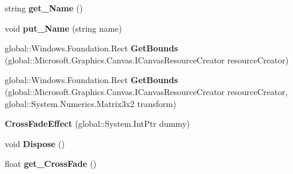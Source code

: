 \begin{DoxyCompactItemize}
\item 
\mbox{\label{class_microsoft_1_1_graphics_1_1_canvas_1_1_effects_1_1_cross_fade_effect_af808185116788b9dbc90748eea7c5c4d}} 
string {\bfseries get\+\_\+\+Name} ()
\item 
\mbox{\label{class_microsoft_1_1_graphics_1_1_canvas_1_1_effects_1_1_cross_fade_effect_a65d1a806b93396c6e843a88f5983e982}} 
void {\bfseries put\+\_\+\+Name} (string name)
\item 
\mbox{\label{class_microsoft_1_1_graphics_1_1_canvas_1_1_effects_1_1_cross_fade_effect_a8c0163e4f456fdcaef36eb8260fbcd61}} 
global\+::\+Windows.\+Foundation.\+Rect {\bfseries Get\+Bounds} (global\+::\+Microsoft.\+Graphics.\+Canvas.\+I\+Canvas\+Resource\+Creator resource\+Creator)
\item 
\mbox{\label{class_microsoft_1_1_graphics_1_1_canvas_1_1_effects_1_1_cross_fade_effect_ab77a284b694bb6816a8514e82b3924f0}} 
global\+::\+Windows.\+Foundation.\+Rect {\bfseries Get\+Bounds} (global\+::\+Microsoft.\+Graphics.\+Canvas.\+I\+Canvas\+Resource\+Creator resource\+Creator, global\+::\+System.\+Numerics.\+Matrix3x2 transform)
\item 
\mbox{\label{class_microsoft_1_1_graphics_1_1_canvas_1_1_effects_1_1_cross_fade_effect_a1ccb8010e1721e5b73f7f2d332372d07}} 
{\bfseries Cross\+Fade\+Effect} (global\+::\+System.\+Int\+Ptr dummy)
\item 
\mbox{\label{class_microsoft_1_1_graphics_1_1_canvas_1_1_effects_1_1_cross_fade_effect_a7e3429fb00e0d8c989d1ee019f8e917d}} 
void {\bfseries Dispose} ()
\item 
\mbox{\label{class_microsoft_1_1_graphics_1_1_canvas_1_1_effects_1_1_cross_fade_effect_a03a1b2e46780db48c746c36e0a0328df}} 
float {\bfseries get\+\_\+\+Cross\+Fade} ()

\end{DoxyCompactItemize}
